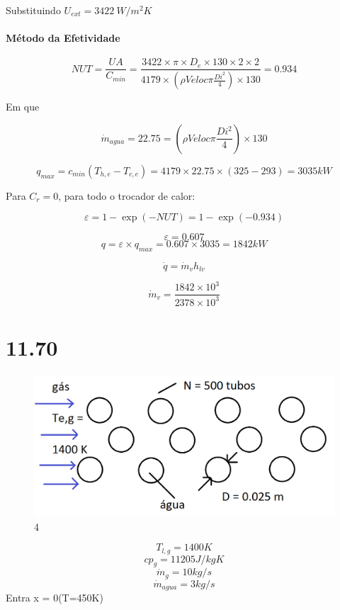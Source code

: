 \documentclass[a4paper, 12pt]{article}
\begin{document}
Substituindo $U_{ext} = 3422 \ W/m^{2}K$  
\paragraph{Método da Efetividade}


\[NUT = \frac{UA}{C_{min}} = \frac{3422 \times \pi \times D_{e} \times 130 \times 2 \times 2}{4179 \times (\rho Veloc \pi \frac{Di^{2}}{4}) \times 130 } = 0.934\]



Em que 

\[\dot{m}_{agua} = 22.75 = (\rho Veloc \pi \frac{Di^{2}}{4}) \times 130\]

\[q_{max}= c_{min}(T_{h,e}-T_{c,e}) = 4179 \times 22.75 \times (325-293) = 3035 kW\]

Para $C_{r} = 0$, para todo o trocador de calor:

\[\varepsilon = 1 - \exp(-NUT)=1-\exp(-0.934)\] 

\[\varepsilon = 0.607\]
\[q = \varepsilon \times q_{max} = 0.607 \times 3035 = 1842 kW\]

\[\dot{q}=\dot{m}_{v}h_{lv}\]

\[\dot{m}_{v}=\frac{1842 \times 10^{3}}{2378 \times 10^{3}}\]

\section{11.70}

\begin{figure}[h]
\begin{center}
\includegraphics[scale=0.38]{./fig/4.png}
\caption{\label{fig:4}4} 
\end{center}
\end{figure}

\[T_{l,g}=1400K\]
\[cp_{g} = 11205 J/kgK\]
\[\dot{m}_{g}=10kg/s\]
\[\dot{m}_{agua}=3 kg/s\]
Entra x = 0(T=450K)
\end{document}
